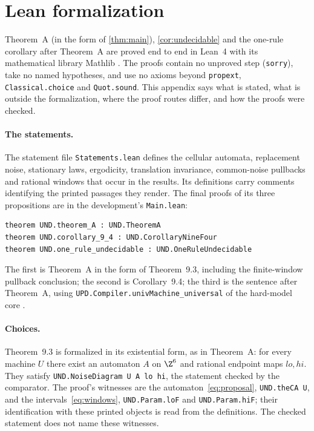 \section{Lean formalization}\label{app:lean}

Theorem~A (in the form of \cref{thm:main}), \cref{cor:undecidable} and the one-rule corollary after Theorem~A are proved end to end in Lean~4 \cite{Lean4} with its mathematical library Mathlib \cite{Mathlib20}. The proofs contain no unproved step (\texttt{sorry}), take no named hypotheses, and use no axioms beyond \texttt{propext}, \texttt{Classical.choice} and \texttt{Quot.sound}. This appendix says what is stated, what is outside the formalization, where the proof routes differ, and how the proofs were checked.

\paragraph{The statements.} The statement file \texttt{Statements.lean} defines the cellular automata, replacement noise, stationary laws, ergodicity, translation invariance, common-noise pullbacks and rational windows that occur in the results. Its definitions carry comments identifying the printed passages they render. The final proofs of its three propositions are in the development's \texttt{Main.lean}:
\begingroup\small
\begin{verbatim}
theorem UND.theorem_A : UND.TheoremA
theorem UND.corollary_9_4 : UND.CorollaryNineFour
theorem UND.one_rule_undecidable : UND.OneRuleUndecidable
\end{verbatim}
\endgroup
The first is Theorem~A in the form of Theorem~9.3, including the finite-window pullback conclusion; the second is Corollary~9.4; the third is the sentence after Theorem~A, using \texttt{UPD.Compiler.univMachine\_universal} of the hard-model core \cite{DMhard}.

\paragraph{Choices.} Theorem~9.3 is formalized in its existential form, as in Theorem~A: for every machine $U$ there exist an automaton $A$ on $\Z^6$ and rational endpoint maps $\mathit{lo},\mathit{hi}$. They satisfy \texttt{UND.NoiseDiagram U A lo hi}, the statement checked by the comparator. The proof's witnesses are the automaton~\eqref{eq:proposal}, \texttt{UND.theCA U}, and the intervals~\eqref{eq:windows}, \texttt{UND.Param.loF} and \texttt{UND.Param.hiF}; their identification with these printed objects is read from the definitions. The checked statement does not name these witnesses.

